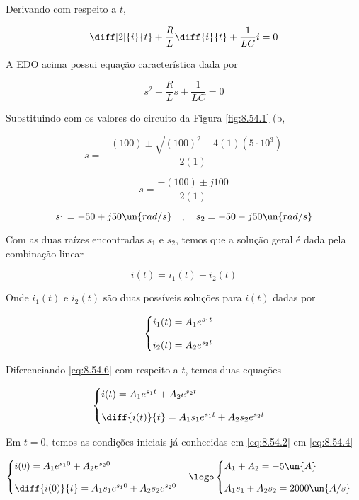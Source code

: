 Derivando com respeito a $t$,   

\[ \diff[2]{i}{t} + \frac{R}{L}\diff{i}{t} + \frac{1}{LC}i = 0 \]

A EDO acima possui equação característica dada por 

\begin{equation}\label{eq:8.54.5}
    s^2 + \frac{R}{L}s + \frac{1}{LC} = 0
\end{equation}

Substituindo com os valores do circuito da Figura \ref*{fig:8.54.1} (b,

\[ s = \frac{-(100) \pm \sqrt{(100)^2 - 4(1)(5 \cdot 10^{3})}}{2(1)} \]

\[ s = \frac{-(100) \pm j100}{2(1)} \]

\[ s_1 = -50 + j50 \un{rad/s} \quad , \quad s_2 = -50 - j50 \un{rad/s} \]

Com as duas raízes encontradas $s_1$ e $s_2$, temos que a solução geral é dada pela combinação linear

\begin{equation}\label{eq:8.54.6}
    i(t) = i_1(t) + i_2(t)
\end{equation}

Onde $i_1(t)$ e $i_2(t)$ são duas possíveis soluções para $i(t)$ dadas por  

\[ \begin{cases}
        i_1(t) = A_1e^{s_1t}  & \\
        \noalign{\vskip9pt}
        i_2(t) = A_2e^{s_2t}
    \end{cases}
\]

Diferenciando \eqref{eq:8.54.6} com respeito a $t$, temos duas equações

\[ \begin{cases}
        i(t) = A_1e^{s_1t} + A_2e^{s_2t} & \\
        \noalign{\vskip9pt}
        \diff{i(t)}{t} = A_1s_1e^{s_1t} + A_2s_2e^{s_2t}
    \end{cases}
\]

Em $t=0$, temos as condições iniciais já conhecidas em \eqref{eq:8.54.2} em \eqref{eq:8.54.4}

\[ \begin{cases}
        i(0) = A_1e^{s_10} + A_2e^{s_20} & \\
        \noalign{\vskip9pt}
        \diff{i(0)}{t} = A_1s_1e^{s_10} + A_2s_2e^{s_20}
    \end{cases}
    \logo
    \begin{cases}
        A_1 + A_2 = -5 \un{A} & \\
        \noalign{\vskip9pt}
        A_1s_1 + A_2s_2 = 2000 \un{A/s}
    \end{cases}
\]

